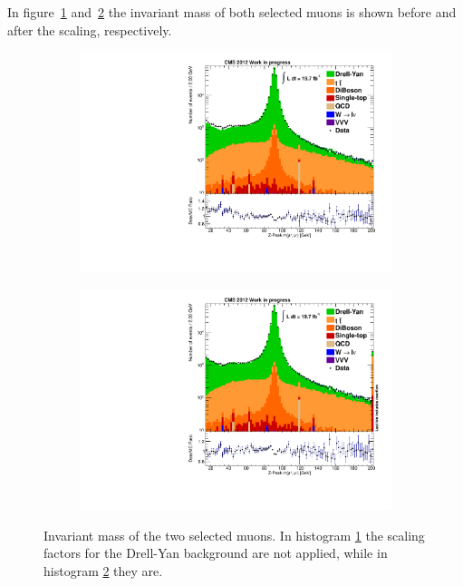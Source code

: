 In figure~\ref{fig:m_mumu_zpeak_nodysf} and~\ref{fig:m_mumu_zpeak} the invariant mass of both selected muons is shown before and after the scaling, respectively.

\begin{figure}[htb!]
  \centering
  \begin{subfigure}[b]{0.495\textwidth}
    \centering
    \includegraphics[width=\textwidth]{plots/m_mumu_zpeak_nodysf.pdf}
    \caption{\label{fig:m_mumu_zpeak_nodysf}}
  \end{subfigure}
  \begin{subfigure}[b]{0.495\textwidth}
    \centering
    \includegraphics[width=\textwidth]{plots/m_mumu_zpeak.pdf}
    \caption{\label{fig:m_mumu_zpeak}}
  \end{subfigure}
  \caption{Invariant mass of the two selected muons. In histogram \ref{fig:m_mumu_zpeak_nodysf} the scaling factors for the Drell-Yan background are not applied, while in histogram \ref{fig:m_mumu_zpeak} they are.}
  \label{fig:dyscaling}
\end{figure}

